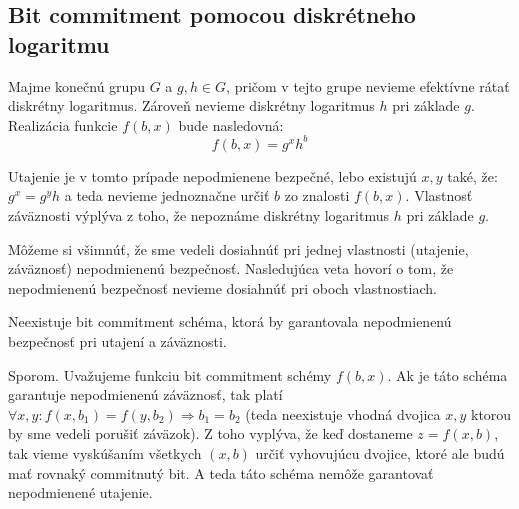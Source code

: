 \subsection{Bit commitment pomocou diskrétneho logaritmu}
Majme konečnú grupu $G$ a $g, h \in G$, pričom v tejto grupe nevieme efektívne rátať diskrétny logaritmus. Zároveň
nevieme diskrétny logaritmus $h$ pri základe $g$.  Realizácia funkcie $f(b,x)$ bude nasledovná: $$f(b,x) = g^x h^b$$

Utajenie je v tomto prípade nepodmienene bezpečné, lebo existujú $x, y$ také, že: $g^x = g^y h$ a teda nevieme jednoznačne
určiť $b$ zo znalosti $f(b,x)$.
Vlastnosť záväznosti výplýva z toho, že nepoznáme diskrétny logaritmus $h$ pri základe $g$.

Môžeme si všimnúť, že sme vedeli dosiahnúť pri jednej vlastnosti (utajenie, záväznosť) nepodmienenú bezpečnosť.
Nasledujúca veta hovorí o tom, že nepodmienenú bezpečnosť nevieme dosiahnúť pri oboch vlastnostiach.

\begin{veta}
Neexistuje bit commitment schéma, ktorá by garantovala nepodmienenú bezpečnosť pri utajení a záväznosti.
\end{veta}

\begin{dokaz}
Sporom. 
Uvažujeme funkciu bit commitment schémy $f(b,x)$. Ak je táto schéma garantuje nepodmienenú záväznosť, tak
platí $\forall x, y\colon f(x,b_1) = f(y,b_2) \Rightarrow b_1 = b_2$ (teda neexistuje vhodná dvojica
$x, y$ ktorou by sme vedeli porušiť záväzok). Z toho vyplýva, že keď dostaneme $z = f(x,b)$, tak vieme 
vyskúšaním všetkych $(x,b)$ určiť vyhovujúcu dvojice, ktoré ale budú mať rovnaký commitnutý bit.
A teda táto schéma nemôže garantovať nepodmienené utajenie.
\end{dokaz}


